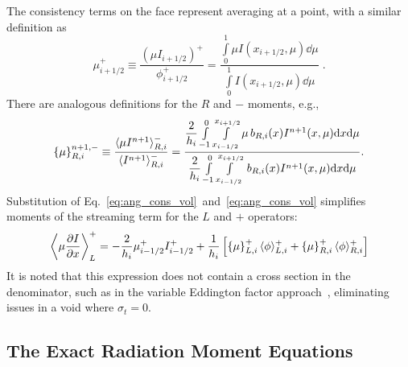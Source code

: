 The consistency terms on the face represent averaging at a point, with a similar
definition as
\begin{equation}\label{eq:ang_cons_face}
    {\mu}_{i+1/2}^{+} \equiv \frac{\left(\mu I_{i+ 1/2}\right)^+}{\phi_{i+1/2}^+}=  \frac{
        {\displaystyle \int\limits_0^1 \mu I(x_{i+1/2},\mu) \dd \mu }} 
        {{\displaystyle \int\limits_0^1 I(x_{i+1/2},\mu) \dd \mu }} \;.
\end{equation}
There are analogous definitions for the $R$ and $-$ moments, e.g.,
\begin{equation}\label{eq:ang_cons_vol}
    \left\{ {\mu} \right\}_{R,i}^{n+1,-} \equiv \frac{\langle \mu I^{n+1} \rangle_{R,i}^-}{\langle I^{n+1} \rangle_{R,i}^-} =  \frac{
        {\displaystyle \frac{2}{h_i}} \int\limits_{-1}^0 \int\limits_{x_{i-1/2}}^{x_{i+1/2}} \mu \, b_{R,i}(x)
I^{n+1}(x,\mu) \mathrm{d} x \mathrm{d} \mu } 
{{\displaystyle \frac{2}{h_i}} \int\limits_{-1}^0 \int\limits_{x_{i-1/2}}^{x_{i+1/2}} \, b_{R,i}(x)
I^{n+1}(x,\mu) \mathrm{d} x \mathrm{d} \mu } .
\end{equation}
Substitution of Eq.~\eqref{eq:ang_cons_vol}~and~\eqref{eq:ang_cons_vol} simplifies
moments of the streaming
term for the $L$ and $+$ operators:
\begin{equation}\label{eq:stream_mom}
        {\displaystyle \left \langle \mu \frac{\partial I}{\partial x} \right \rangle_L^+ } = 
        -\frac{\displaystyle2}{\displaystyle h_i} \mu_{i-1/2}^+ I_{i-1/2}^+ + \frac{1}{h_i}\left[
        \left\{ \mu \right\}_{L,i}^+ \langle \phi \rangle^+_{L,i} + \left\{ \mu \right\}_{R,i}^+ \langle \phi \rangle_{R,i}^+
    \right]
\end{equation}
It is noted that this expression does not contain a cross section in the denominator,
such as in the variable Eddington factor approach~\cite{ferguson}, eliminating 
issues in a void where $\sigma_t=0$.


\subsection{The Exact Radiation Moment Equations}

